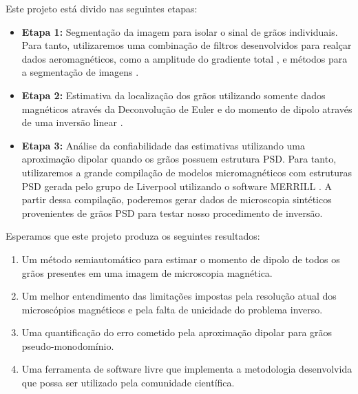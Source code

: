\documentclass[12pt,a4paper,oneside]{book}
\renewcommand{\chaptermark}[1]{\markboth{#1}{}}
\begin{document}
Este projeto está divido nas seguintes etapas:

\begin{itemize}
  \item \textbf{Etapa 1:} Segmentação da imagem para isolar o sinal de grãos
    individuais. Para tanto, utilizaremos uma combinação de filtros
    desenvolvidos para realçar dados aeromagnéticos, como a amplitude do
    gradiente total \citep{Roest1992}, e métodos para a segmentação de imagens
    \citep[e.g., ][]{Neubert2014}.
  \item \textbf{Etapa 2:} Estimativa da localização dos grãos
    utilizando somente dados magnéticos através da Deconvolução de Euler
    \citep{Reid1990} e do momento de dipolo através de uma inversão linear
    \citep{OliveiraJr2015}.
  \item \textbf{Etapa 3:} Análise da confiabilidade das estimativas utilizando
    uma aproximação dipolar quando os grãos possuem estrutura PSD. Para tanto,
    utilizaremos a grande compilação de modelos micromagnéticos com estruturas
    PSD gerada pelo grupo de Liverpool utilizando o software MERRILL
    \citep{Conbhui2018}. A partir dessa compilação, poderemos gerar dados de
    microscopia sintéticos provenientes de grãos PSD para testar nosso
    procedimento de inversão.
\end{itemize}

\noindent
Esperamos que este projeto produza os seguintes resultados:

\begin{enumerate}
  \item Um método semiautomático para estimar o momento de dipolo de todos os
    grãos presentes em uma imagem de microscopia magnética.
  \item Um melhor entendimento das limitações impostas pela resolução atual dos
    microscópios magnéticos e pela falta de unicidade do problema inverso.
  \item Uma quantificação do erro cometido pela aproximação dipolar para grãos
    pseudo-monodomínio.
  \item Uma ferramenta de software livre que implementa a metodologia
    desenvolvida que possa ser utilizado pela comunidade científica.
\end{enumerate}

\backmatter


\chaptermark{Referências Bibliográficas}
\end{document}
